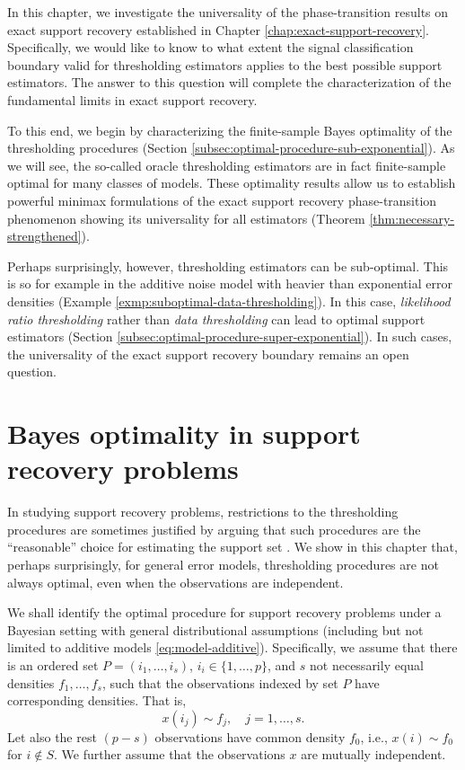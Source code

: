 
In this chapter, we investigate the universality of the phase-transition results on exact support recovery established in
Chapter \ref{chap:exact-support-recovery}.  Specifically, we would like to know to what extent the signal classification 
boundary valid for thresholding estimators applies to the best possible support estimators.  The answer to this question 
will complete the characterization of the fundamental limits in exact support recovery.

To this end, we begin by characterizing the finite-sample Bayes optimality of the thresholding procedures (Section
\ref{subsec:optimal-procedure-sub-exponential}). As we will see, the so-called oracle thresholding estimators are in 
fact finite-sample optimal for many classes of models.  These optimality results allow us to establish 
powerful minimax formulations of the exact support recovery phase-transition phenomenon showing its universality for all estimators (Theorem \ref{thm:necessary-strengthened}). 

Perhaps surprisingly, however, thresholding estimators can be sub-optimal.  This is so for example 
in the additive noise model with heavier than exponential error densities (Example 
\ref{exmp:suboptimal-data-thresholding}).   In this case, {\em likelihood ratio
thresholding} rather than {\em data thresholding} can lead to optimal support estimators
(Section \ref{subsec:optimal-procedure-super-exponential}).  In such cases, the universality 
of the exact support recovery boundary remains an open question. 




\section{Bayes optimality in support recovery problems}
\label{subsec:Bayes-optimality}

In studying support recovery problems, restrictions to the thresholding procedures 
are sometimes justified by arguing that such procedures are the ``reasonable'' choice for estimating the support set \citep[see, e.g.,][]{arias2017distribution}.
We show in this chapter that, perhaps surprisingly, for general error models, thresholding procedures are not always 
optimal, even when the observations are independent.

We shall identify the optimal procedure for support recovery problems under a Bayesian setting with general distributional assumptions (including but not limited to additive models \eqref{eq:model-additive}).
Specifically, we assume that there is an ordered set $P = (i_1,\ldots,i_s)$, $i_i\in\{1,\ldots,p\}$, and $s$ not necessarily equal densities $f_{1}, \ldots, f_{s}$, such that the observations indexed by set $P$ have corresponding densities. That is,
\begin{equation} \label{eq:signal-distributions-ordered}
x(i_j) \sim f_j, \quad j=1,\ldots,s.
\end{equation}
Let also the rest $(p-s)$ observations have common density $f_0$, i.e., $x(i)\sim f_0$ for $i\not\in S$.
We further assume that the observations $x$ are mutually independent.


